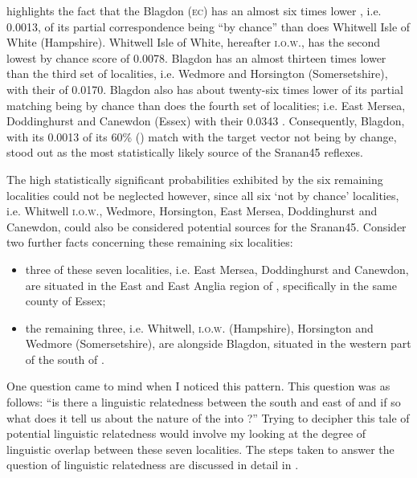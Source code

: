  highlights the fact that the Blagdon (\textsc{ec}) has an almost six times lower , i.e. 0.0013, of its partial correspondence being ``by chance'' than does Whitwell Isle of White (Hampshire). Whitwell Isle of White, hereafter \textsc{i.o.w}., has the second lowest by chance score of 0.0078. Blagdon has an almost thirteen times lower  than the third set of localities, i.e. Wedmore and Horsington (Somersetshire), with their  of 0.0170. Blagdon also has about twenty-six times lower  of its partial matching being by chance than does the fourth set of localities; i.e. East Mersea, Doddinghurst and Canewdon (Essex) with their 0.0343 . Consequently, Blagdon, with its 0.0013  of its 60\% () match with the target vector not being by change, stood out as the most statistically likely source of the Sranan45 reflexes.

The high statistically significant probabilities exhibited by the six remaining localities could not be neglected however, since all six `not by chance' localities, i.e. Whitwell \textsc{i.o.w}., Wedmore, Horsington, East Mersea, Doddinghurst and Canewdon, could also be considered potential sources for the Sranan45. Consider two further facts concerning these remaining six localities:

\begin{itemize}
\item {three of these seven localities, i.e. East Mersea, Doddinghurst and Canewdon, are situated in the East and East Anglia region of , specifically in the same county of Essex;}
\item {the remaining three, i.e. Whitwell, \textsc{i.o.w}. (Hampshire), Horsington and Wedmore (Somersetshire), are alongside Blagdon, situated in the western part of the south of .}
\end{itemize}

One question came to mind when I noticed this pattern. This question was as follows: ``is there a linguistic relatedness between the south and east of  and if so what does it tell us about the nature of the   into ?'' Trying to decipher this tale of potential linguistic relatedness would involve my looking at the degree of linguistic overlap between these seven localities. The steps taken to answer the question of linguistic relatedness are discussed in detail in .

